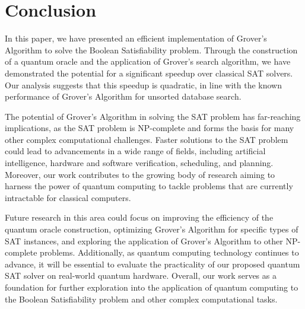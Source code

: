 \section{Conclusion}

In this paper, we have presented an efficient implementation of Grover's Algorithm to solve the Boolean Satisfiability problem. Through the construction of a quantum oracle and the application of Grover's search algorithm, we have demonstrated the potential for a significant speedup over classical SAT solvers. Our analysis suggests that this speedup is quadratic, in line with the known performance of Grover's Algorithm for unsorted database search.

The potential of Grover's Algorithm in solving the SAT problem has far-reaching implications, as the SAT problem is NP-complete and forms the basis for many other complex computational challenges. Faster solutions to the SAT problem could lead to advancements in a wide range of fields, including artificial intelligence, hardware and software verification, scheduling, and planning. Moreover, our work contributes to the growing body of research aiming to harness the power of quantum computing to tackle problems that are currently intractable for classical computers.

Future research in this area could focus on improving the efficiency of the quantum oracle construction, optimizing Grover's Algorithm for specific types of SAT instances, and exploring the application of Grover's Algorithm to other NP-complete problems. Additionally, as quantum computing technology continues to advance, it will be essential to evaluate the practicality of our proposed quantum SAT solver on real-world quantum hardware. Overall, our work serves as a foundation for further exploration into the application of quantum computing to the Boolean Satisfiability problem and other complex computational tasks.

